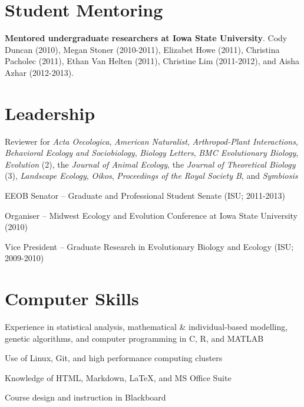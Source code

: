 \documentclass[letterpaper]{article}
\renewenvironment{itemize}{
  \begin{list}{}{
    \setlength{\leftmargin}{1.5em}
  }
}{
  \end{list}
}
\begin{document}
\section*{Student Mentoring}
\begin{itemize}
\item {\bf Mentored undergraduate researchers at Iowa State University}. Cody Duncan (2010), Megan Stoner (2010-2011), Elizabet Howe (2011), Christina Pacholec (2011), Ethan Van Helten (2011), Christine Lim (2011-2012), and Aisha Azhar (2012-2013).
\end{itemize}

\section*{Leadership}
\begin{itemize}
\item Reviewer for {\it Acta Oecologica}, {\it American Naturalist}, {\it Arthropod-Plant Interactions}, {\it Behavioral Ecology and Sociobiology}, {\it Biology Letters}, {\it BMC Evolutionary Biology}, {\it Evolution} (2), the {\it Journal of Animal Ecology}, the {\it Journal of Theoretical Biology} (3), {\it Landscape Ecology}, {\it Oikos}, {\it Proceedings of the Royal Society B}, and {\it Symbiosis} 
\item EEOB Senator -- Graduate and Professional Student Senate (ISU; 2011-2013)
\item Organiser -- Midwest Ecology and Evolution Conference at Iowa State University (2010)
\item Vice President -- Graduate Research in Evolutionary Biology and Ecology (ISU; 2009-2010)
\end{itemize}

\section*{Computer Skills}
\begin{itemize}
\item Experience in statistical analysis, mathematical \& individual-based modelling, genetic algorithms, and computer programming in C, R, and MATLAB
\item Use of Linux, Git, and high performance computing clusters
\item Knowledge of HTML, Markdown, \LaTeX, and MS Office Suite
\item Course design and instruction in Blackboard
\end{itemize}
\end{document}
